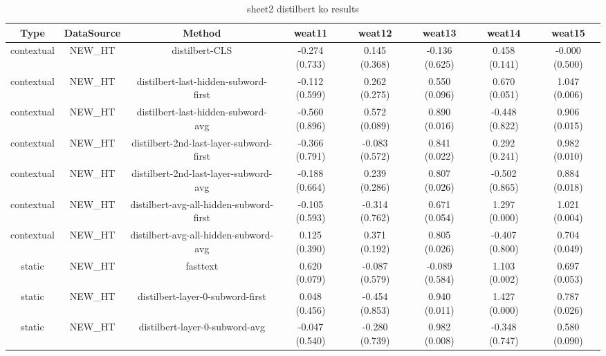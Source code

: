 \begin{sidewaystable}[htb]
    \centering
    \caption{sheet2 distilbert ko results}
    \label{appendix_tab:sheet2_distilbert_ko_results}
    \small
    \begin{tabular}{@{}cccccccc@{}}
        \toprule
        Type & DataSource & Method & weat11 & weat12 & weat13 & weat14 & weat15 \\
        \midrule
        contextual & NEW\_HT & distilbert-CLS & -0.274 (0.733) & 0.145 (0.368) & -0.136 (0.625) & 0.458 (0.141) & -0.000 (0.500) \\
        contextual & NEW\_HT & distilbert-last-hidden-subword-first & -0.112 (0.599) & 0.262 (0.275) & 0.550 (0.096) & 0.670 (0.051) & 1.047 (0.006) \\
        contextual & NEW\_HT & distilbert-last-hidden-subword-avg & -0.560 (0.896) & 0.572 (0.089) & 0.890 (0.016) & -0.448 (0.822) & 0.906 (0.015) \\
        contextual & NEW\_HT & distilbert-2nd-last-layer-subword-first & -0.366 (0.791) & -0.083 (0.572) & 0.841 (0.022) & 0.292 (0.241) & 0.982 (0.010) \\
        contextual & NEW\_HT & distilbert-2nd-last-layer-subword-avg & -0.188 (0.664) & 0.239 (0.286) & 0.807 (0.026) & -0.502 (0.865) & 0.884 (0.018) \\
        contextual & NEW\_HT & distilbert-avg-all-hidden-subword-first & -0.105 (0.593) & -0.314 (0.762) & 0.671 (0.054) & 1.297 (0.000) & 1.021 (0.004) \\
        contextual & NEW\_HT & distilbert-avg-all-hidden-subword-avg & 0.125 (0.390) & 0.371 (0.192) & 0.805 (0.026) & -0.407 (0.800) & 0.704 (0.049) \\
        static & NEW\_HT & fasttext & 0.620 (0.079) & -0.087 (0.579) & -0.089 (0.584) & 1.103 (0.002) & 0.697 (0.053) \\
        static & NEW\_HT & distilbert-layer-0-subword-first & 0.048 (0.456) & -0.454 (0.853) & 0.940 (0.011) & 1.427 (0.000) & 0.787 (0.026) \\
        static & NEW\_HT & distilbert-layer-0-subword-avg & -0.047 (0.540) & -0.280 (0.739) & 0.982 (0.008) & -0.348 (0.747) & 0.580 (0.090) \\
        \bottomrule
    \end{tabular}
\end{sidewaystable}
